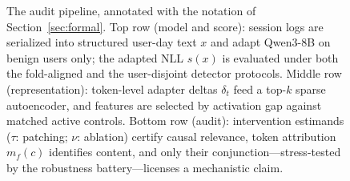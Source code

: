 \begin{figure}[t]
{}%
\caption{The audit pipeline, annotated with the notation of
Section~\ref{sec:formal}. Top row (model and score): session logs are
serialized into structured user-day text $x$ and adapt Qwen3-8B on benign
users only; the adapted NLL $s(x)$ is evaluated under both the fold-aligned
and the user-disjoint detector protocols. Middle row (representation):
token-level adapter deltas $\delta_t$ feed a top-$k$ sparse autoencoder,
and features are selected by activation gap against matched active
controls. Bottom row (audit): intervention estimands ($\tau$: patching;
$\nu$: ablation) certify causal relevance, token attribution $m_f(c)$
identifies content, and only their conjunction---stress-tested by the
robustness battery---licenses a mechanistic claim.}
\label{fig:pipeline}
\end{figure}
